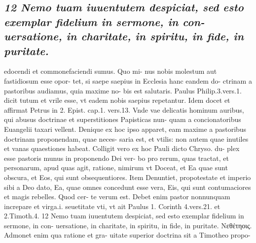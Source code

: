 \documentclass{article}
\begin{document}
\begin{pages}
\subsection*{\textit{12 Nemo tuam iuuentutem despiciat, sed esto exemplar fidelium in sermone, in con- uersatione, in charitate, in spiritu, in fide, in puritate.}}edocendi et commonefaciendi sumus. Quo mi- nus nobis molestum aut fastidiosum esse opor- tet, si saepe saepius in Ecclesia hanc eandem do- ctrinam a pastoribus audiamus, quia maxime no- bis est salutaris. Paulus Philip.3.vers.1. dicit tutum et vrile esse, vt eadem nobis saepius repetantur. Idem docet et affirmat Petrus in 2. Epist. cap.1. vers.13. Vnde vae delicatis hominum auribus, qui abusus doctrinae et superstitiones Papisticas nun- quam a concionatoribus Euangelii taxari vellent. Denique ex hoc ipso apparet, eam maxime a pastoribus doctrinam proponendam, quae neces- saria est, et vtilis: non autem quae inutiles et vanas quaestiones habeat. Colligit vero ex hoc Pauli dicto Chryso. du- plex esse pastoris munus in proponendo Dei ver- bo pro rerum, quas tractat, et personarum, apud quas agit, ratione, nimirum vt Doceat, et Ea quae sunt obscura, et Eos, qui sunt obsequentiores. Item Denuntiet, propotestate et imperio sibi a Deo dato, Ea, quae omnes concedunt esse vera, Eis, qui sunt contumaciores et magis rebelles. Quod cer- te verum est. Debet enim pastor nonnunquam increpare et virga.i. seuetitate vti, vt ait Paulus 1. Corinth 4.vers.21. et 2.Timoth.4. 12 Nemo tuam iuuentutem despiciat, sed esto exemplar fidelium in sermone, in con- uersatione, in charitate, in spiritu, in fide, in puritate. Νεθέτηοις. Admonet enim qua ratione et gra- uitate superior doctrina sit a Timotheo propo-  \pend

\end{pages}
\end{document}
